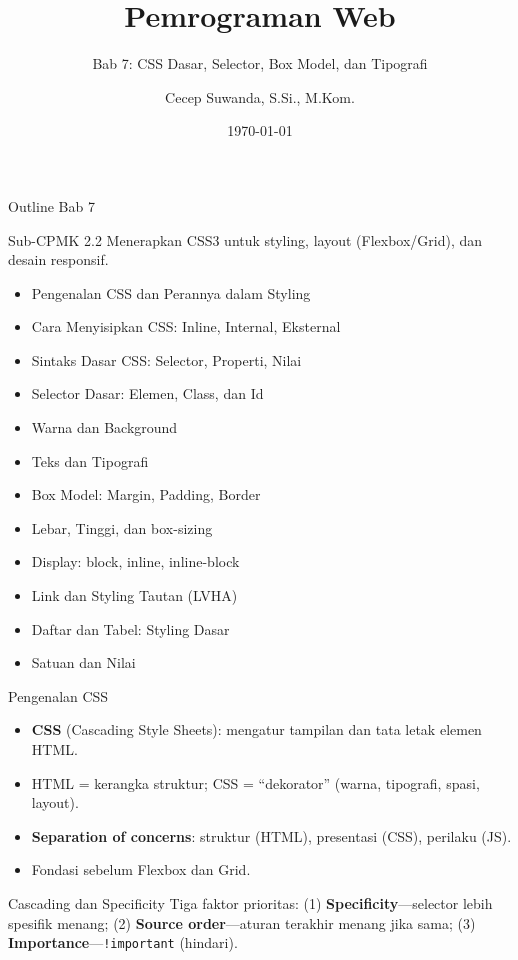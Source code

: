 \documentclass[handout]{beamer}
\title[Bab 7 -- CSS Dasar]{Pemrograman Web}
\subtitle{Bab 7: CSS Dasar, Selector, Box Model, dan Tipografi}
\author{Cecep Suwanda, S.Si., M.Kom.}
\institute{Universitas Bale Bandung}
\date{\today}
\begin{document}
\begin{frame}
	\titlepage
\end{frame}

\begin{frame}[shrink=15]{Outline Bab 7}
	\begin{block}{Sub-CPMK 2.2}
		Menerapkan CSS3 untuk styling, layout (Flexbox/Grid), dan desain responsif.
	\end{block}
	\begin{itemize}
		\item Pengenalan CSS dan Perannya dalam Styling
		\item Cara Menyisipkan CSS: Inline, Internal, Eksternal
		\item Sintaks Dasar CSS: Selector, Properti, Nilai
		\item Selector Dasar: Elemen, Class, dan Id
		\item Warna dan Background
		\item Teks dan Tipografi
		\item Box Model: Margin, Padding, Border
		\item Lebar, Tinggi, dan box-sizing
		\item Display: block, inline, inline-block
		\item Link dan Styling Tautan (LVHA)
		\item Daftar dan Tabel: Styling Dasar
		\item Satuan dan Nilai
	\end{itemize}
\end{frame}

\begin{frame}{Pengenalan CSS}
	\begin{itemize}
		\item \textbf{CSS} (Cascading Style Sheets): mengatur tampilan dan tata letak elemen HTML.
		\item HTML = kerangka struktur; CSS = ``dekorator'' (warna, tipografi, spasi, layout).
		\item \textbf{Separation of concerns}: struktur (HTML), presentasi (CSS), perilaku (JS).
		\item Fondasi sebelum Flexbox dan Grid.
	\end{itemize}
	\begin{block}{Cascading dan Specificity}
		Tiga faktor prioritas: (1) \textbf{Specificity}---selector lebih spesifik menang; (2) \textbf{Source order}---aturan terakhir menang jika sama; (3) \textbf{Importance}---\texttt{!important} (hindari).
	\end{block}
\end{frame}
\end{document}
